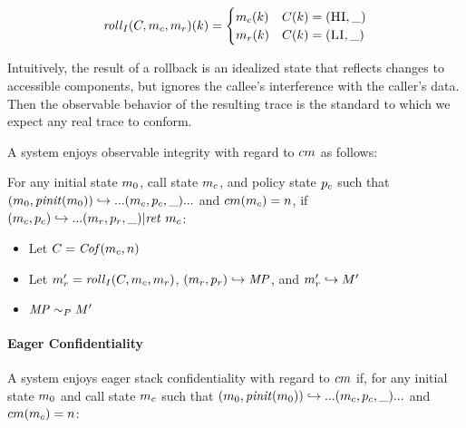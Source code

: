 \documentclass[conference]{IEEEtran}
\begin{document}
      \[\mathit{roll}_I(C,m_c,m_r)(k) =
      \begin{cases}
        m_c(k) & C(k) = (\textsc{HI},\_) \\
        m_r(k) & C(k) = (\textsc{LI},\_) \\
      \end{cases}\]

      Intuitively, the result of a rollback is an idealized state that reflects changes to accessible
      components, but ignores the callee's interference with the caller's data. Then the observable
      behavior of the resulting trace is the standard to which we expect any real trace to conform.

      A system enjoys observable integrity with regard to \(cm\) as follows:

      For any initial state \(m_0\), call state \(m_c\), and policy state \(p_c\) such that
      \((m_0,\mathit{pinit}(m_0)) \hookrightarrow ... (m_c,p_c,\_) ...\)
      and \(cm(m_c) = n\), if \((m_c,p_c) \hookrightarrow ...
        (m_r,p_r,\_) | \mathit{ret}\ m_c\):

          \begin{itemize}
            \item Let \(C = \mathit{Cof}(m_c,n)\)
            \item Let \(m_r' = \mathit{roll}_I(C,m_c,m_r)\), \((m_r,p_r)
              \hookrightarrow \mathit{MP}\), and \(m_r' \hookrightarrow M'\)
            \item \(\mathit{MP} \sim_P M'\)
          \end{itemize}
    
    \paragraph{Eager Confidentiality}

      A system enjoys eager stack confidentiality with regard to \(cm\) if, for any initial state
      \(m_0\) and call state \(m_c\) such that
      \((m_0,\mathit{pinit}(m_0)) \hookrightarrow ... (m_c,p_c,\_) ...\) and
      \(cm(m_c) = n\):
\end{document}
